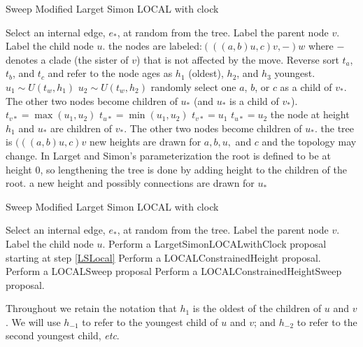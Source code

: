 \documentclass[letterpaper]{article}
\begin{document}
\begin{algorithm} 
\caption{Sweep Modified Larget Simon LOCAL with clock}
\label{lsl}
\begin{algorithmic}[1]
	\STATE Select an internal edge, $e_{*}$, at random from the tree.
	\STATE Label the parent node $v$.
	\STATE Label the child node $u$.
		\STATE the nodes are labeled:$(((a,b)u,c)v,-)w$ where $-$ denotes a clade (the sister of $v$) that is not affected by the move. 
		\STATE \label{LSLocal} Reverse sort $t_a$, $t_b$, and $t_c$ and refer to the node ages as $h_1$ (oldest), $h_2$, and $h_3$ youngest.
		\STATE $u_1\sim U(t_w, h_1)$
		\STATE $u_2\sim U(t_w, h_2)$
			\STATE randomly select one $a$, $b$, or $c$ as a child of $v_*$. The other two nodes become children of $u_*$ (and $u_*$ is a child of $v_*$).
			\STATE $t_{v*} = \max(u_1,u_2)$
			\STATE $t_{u*} = \min(u_1,u_2)$
		\ELSE
			\STATE $t_{v*}  = u_1$
			\STATE $t_{u*}  = u_2$
			\STATE the node at height $h_1$ and $u_*$ are children of $v_*$. The other two nodes become children of $u_*$.
		\ENDIF
	\ELSE
		\STATE the tree is $(((a,b)u,c)v$
		\STATE new heights are drawn for $a,b,u,$ and $c$ and the topology may change. In Larget and Simon's parameterization the root is defined to be at height 0, so lengthening the tree is done by adding height to the children of the root.
		\STATE a new height and possibly connections are drawn for $u_*$
	\ENDIF
\end{algorithmic}
\end{algorithm} 

\begin{algorithm} 
\caption{Sweep Modified Larget Simon LOCAL with clock}
\label{algStart}
\begin{algorithmic}[1]
	\STATE Select an internal edge, $e_{*}$, at random from the tree.
	\STATE Label the parent node $v$.
	\STATE Label the child node $u$.
	\ENDIF
			\STATE Perform a {\sf LargetSimonLOCALwithClock} proposal starting at step \ref{LSLocal}
		\ELSE
			\STATE Perform a {\sf LOCALConstrainedHeight} proposal.
		\ENDIF
		\STATE Perform a {\sf LOCALSweep} proposal 
	\ELSE
		\STATE Perform a {\sf LOCALConstrainedHeightSweep} proposal.
	\ENDIF
\end{algorithmic}
\end{algorithm} 

Throughout we retain the notation that $h_1$ is the oldest of the children of $u$ and $v$.
We will use $h_{-1}$ to refer to the youngest child of $u$ and $v$; and $h_{-2}$ to refer to the second youngest child, {\em etc}.
\end{document}
